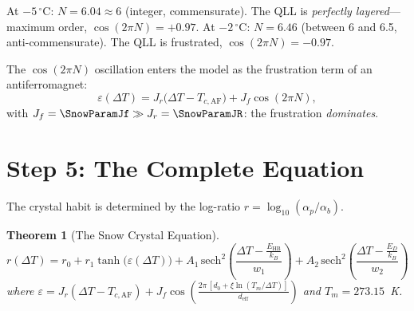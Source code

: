 \documentclass[12pt,letterpaper]{article}
\newtheorem{theorem}{Theorem}
\begin{document}
At $-5\,{}^\circ$C: $N = 6.04 \approx 6$ (integer, commensurate).  The QLL is \emph{perfectly layered}---maximum order, $\cos(2\pi N) = +0.97$.
At $-2\,{}^\circ$C: $N = 6.46$ (between 6 and 6.5, anti-commensurate).  The QLL is frustrated, $\cos(2\pi N) = -0.97$.

The $\cos(2\pi N)$ oscillation enters the model as the frustration term of an antiferromagnet:
\begin{equation}
\varepsilon(\Delta T) = J_r \bigl(\Delta T - T_{c,\mathrm{AF}}\bigr) + J_f \cos(2\pi N),
\label{eq:eps}
\end{equation}
with $J_f = \SnowParamJf \gg J_r = \SnowParamJR$: the frustration \emph{dominates}.

\section{Step 5: The Complete Equation}
\label{sec:equation}

The crystal habit is determined by the log-ratio $r = \log_{10}(\alpha_p / \alpha_b)$.

\begin{theorem}[The Snow Crystal Equation]
\begin{equation}
\boxed{r(\Delta T) = r_0 + r_1 \tanh\!\bigl(\varepsilon(\Delta T)\bigr) + A_1 \,\mathrm{sech}^2\!\left(\frac{\Delta T - \frac{E_{\mathrm{HB}}}{k_B}}{w_1}\right) + A_2 \,\mathrm{sech}^2\!\left(\frac{\Delta T - \frac{E_D}{k_B}}{w_2}\right)}
\label{eq:main}
\end{equation}
where $\varepsilon = J_r(\Delta T - T_{c,\mathrm{AF}}) + J_f \cos\!\left(\frac{2\pi\,[d_0 + \xi \ln(T_m/\Delta T)]}{d_{\mathrm{eff}}}\right)$ and $T_m = 273.15$~K.
\end{theorem}
\end{document}
